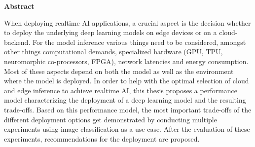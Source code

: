 \vspace*{2cm}

\begin{center}
    \textbf{Abstract}
\end{center}

\vspace*{1cm}


\noindent When deploying realtime AI applications, a crucial aspect is the decision whether to deploy the underlying deep learning models on edge devices or on a cloud-backend.
For the model inference various things need to be considered, amongst other things computational demands,
specialized hardware (GPU, TPU, neuromorphic co-processors, FPGA),
network latencies and energy consumption. Most of these aspects depend on both the model as well as the environment where the model is deployed. 
In order to help with the optimal selection of cloud and edge inference to achieve realtime AI, this thesis proposes a performance model characterizing the deployment of a deep learning model and the resulting trade-offs.
Based on this performance model, the most important trade-offs of the different deployment options get demonstrated by conducting multiple experiments using image classification as a use case. After the evaluation of these experiments, recommendations for the deployment are proposed.







